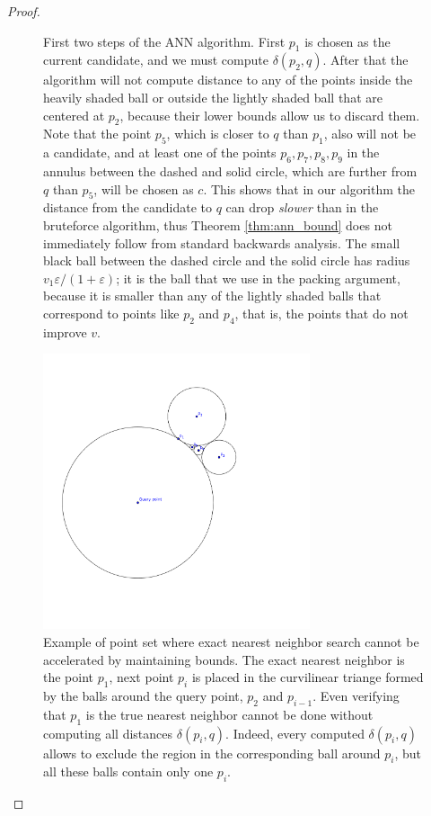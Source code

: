 \documentclass[a4paper,UKenglish,cleveref, autoref]{lipics-v2019}
\newcommand{\eps}{\varepsilon}
\newcommand{\dist}{\delta}
\begin{document}
\begin{proof}
\begin{figure}[ht!]
\caption{First two steps of the ANN algorithm. First $p_1$ is 
chosen as the current candidate, and we must compute $\dist(p_2, q)$. After that the algorithm will not compute
distance to any of the points inside the heavily shaded ball or outside the lightly shaded ball that are centered at $p_2$, because their lower bounds allow us to discard them. Note that the point $p_5$, which
is closer to $q$ than $p_1$, also will not be a candidate, and at least one of the points $p_6,p_7,p_8,p_9$ in the annulus between the dashed and solid circle, which are further from $q$ than $p_5$, will be chosen as $c$. This shows that in our algorithm the distance from the candidate to $q$ can drop \textit{slower} than in the bruteforce algorithm, thus Theorem \ref{thm:ann_bound} does not immediately follow from standard backwards analysis. The small black ball between the dashed circle and the solid circle has radius $v_1 \eps / (1 + \eps)$; it is the ball that we use in the packing argument, because it is smaller than any of the lightly shaded balls that correspond to points like $p_2$ and $p_4$, that is, the points that do not improve $v$.}
\label{fig:ann_illustration}
\end{figure}


\begin{figure}[hb!]
    \includegraphics[width=0.7\textwidth]{pics/exact_bad_example.png}
    \caption{Example of point set where exact nearest neighbor search cannot be accelerated by maintaining bounds.
    The exact nearest neighbor is the point $p_1$, next point $p_i$ is placed 
    in the curvilinear triange formed by the balls around the query point, $p_2$ and $p_{i-1}$. Even verifying that $p_1$
    is the true nearest neighbor cannot be done without computing all distances $\dist(p_i,q)$. Indeed, every computed
    $\dist(p_i,q)$ allows to exclude the region in the corresponding ball around $p_i$, but all these balls contain only one $p_i$.}
    \label{fig:exact_bad_example}
\end{figure}





\end{proof}
\end{document}
